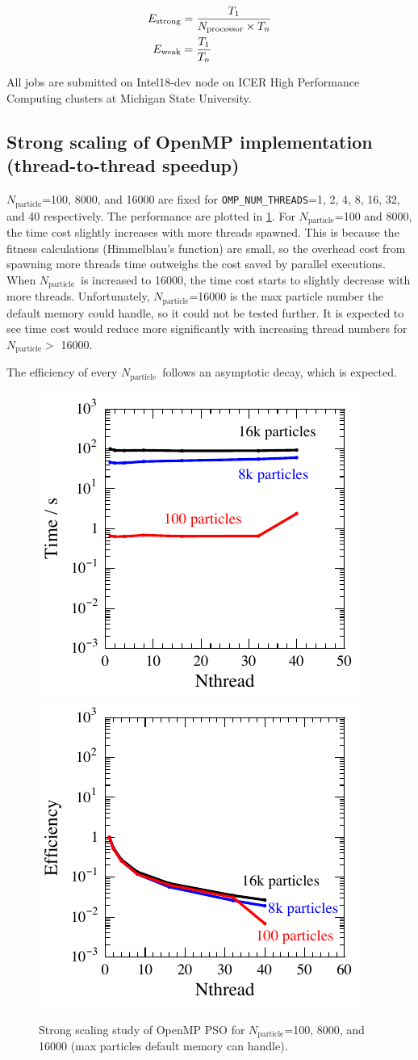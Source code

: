 \documentclass[conference, 10pt]{IEEEtran}
\newcommand{\N}[1]{\ensuremath{N_\text{#1}}}
\newcommand{\Np}{\N{particle}}
\newcommand{\Nproc}{\N{processor}}
\newcommand{\code}[1]{\texttt{\textcolor{BrickRed}{#1}}}
\begin{document}
\begin{align}
E_\text{strong} &= \frac{T_1}{\text{\Nproc}\times T_n}  
\label{eq: strong_scaling}\\
E_\text{weak} &= \frac{T_1}{T_n}
\label{eq: weak_scaling}
\end{align}

All jobs are submitted on Intel18-dev node on ICER High Performance Computing clusters at Michigan State University.



\subsection{Strong scaling of OpenMP implementation (thread-to-thread speedup)}

\Np=100, 8000, and 16000 are fixed for \code{OMP\_NUM\_THREADS}=1, 2, 4, 8, 16, 32, and 40 respectively.
The performance are plotted in \cref{fig: omp_strong}.
For \Np=100 and 8000, the time cost slightly increases with more threads spawned.
This is because the fitness calculations (Himmelblau's function) are small, so the overhead cost from spawning more threads time outweighs the cost saved by parallel executions. 
When \Np\ is increased to 16000, the time cost starts to slightly decrease with more threads.
Unfortunately, \Np=16000 is the max particle number the default memory could handle, so it could not be tested further.
It is expected to see time cost would reduce more significantly with increasing thread numbers for \Np $>$ 16000.

The efficiency of every \Np\ follows an asymptotic decay, which is expected.

\begin{figure}[h!]
\centering
\includegraphics[width=0.45\linewidth]{omp_strong_time} 
\includegraphics[width=0.45\linewidth]{omp_strong_effi}
\caption{Strong scaling study of OpenMP PSO for \Np=100, 8000, and 16000 (max particles default memory can handle).}
\label{fig: omp_strong}
\end{figure}
\end{document}
